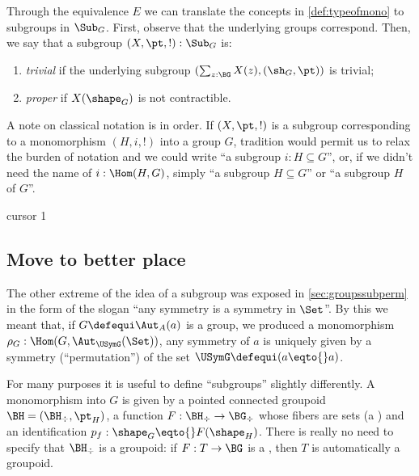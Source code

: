 Through the equivalence $E$ we can translate the concepts in
\cref{def:typeofmono} to subgroups in $\Sub_G$. 
First, observe that the underlying groups correspond. 
Then, we say that a subgroup $(X,\pt,!):\Sub_G$ is:
      \begin{enumerate}
      \item \emph{trivial} if the underlying subgroup
      $(\sum_{z:\BG}X(z),(\sh_G,\pt))$ is trivial;
      \item \emph{proper} if $X(\shape_G)$ is not
      contractible.
      \end{enumerate}

      \begin{remark}
      \label{rem:notationsubgroup}
      A note on classical notation is in order.
If $(X,\pt,!)$ is a subgroup corresponding to a monomorphism $(H,i,!)$ into a group $G$, tradition would permit us to relax the burden of notation and we could write ``a subgroup $i:H\subseteq G$'', or, if we didn't need the name of $i:\Hom(H,G)$, simply ``a subgroup $H\subseteq G$'' or ``a subgroup $H$ of $G$''.
    \end{remark}
    

    {\large cursor 1}
    
    \subsection{Move to better place}
    


The other extreme of the idea of a subgroup was exposed in \cref{sec:groupssubperm} in the form of the slogan ``any symmetry is a symmetry in $\Set$''.
By this we meant that, if $G \defequi \Aut_A(a)$ is a group, we produced a monomorphism $\rho_G:\Hom(G,\Aut_{\USymG}(\Set))$,
\ie any symmetry of $a$ is uniquely given by a symmetry (``permutation'') of the set $\USymG\defequi (a\eqto{}a)$.

For many purposes it is useful to define ``subgroups'' slightly differently.
A monomorphism into $G$ is given by a pointed connected groupoid  $\BH=(\BH_\div,\pt_H)$, a function $F:\BH_\div\to\BG_\div$ whose fibers are sets (a \covering) and an identification $p_f:\shape_G\eqto{}F(\shape_H)$.  There is really no need to specify that $\BH_\div$ is a groupoid: if $F:T\to \BG$ is a \covering, then $T$ is automatically a groupoid.

